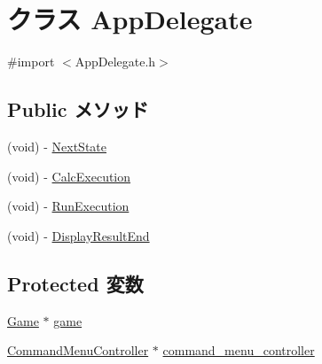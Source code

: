 \hypertarget{interface_app_delegate}{\section{クラス App\-Delegate}
\label{interface_app_delegate}
}


{\ttfamily \#import $<$App\-Delegate.\-h$>$}

\subsection*{Public メソッド}
\begin{DoxyCompactItemize}
\item 
(void) -\/ \hyperlink{interface_app_delegate_ac84379e54561a1bc2cf421eb4e9c49f4}{Next\-State}
\item 
(void) -\/ \hyperlink{interface_app_delegate_ade1d7fc268b1a5e2ba648c6cf160caf9}{Calc\-Execution}
\item 
(void) -\/ \hyperlink{interface_app_delegate_a1a8f91441d9c9bdfbf56a2ab02e7cb70}{Run\-Execution}
\item 
(void) -\/ \hyperlink{interface_app_delegate_a6d6ef9981f422be305b9d0b2217b89ff}{Display\-Result\-End}
\end{DoxyCompactItemize}
\subsection*{Protected 変数}
\begin{DoxyCompactItemize}
\item 
\hyperlink{class_game}{Game} $\ast$ \hyperlink{interface_app_delegate_a4f90e50bfc6e8e02332eb2734de1e93f}{game}
\item 
\hyperlink{interface_command_menu_controller}{Command\-Menu\-Controller} $\ast$ \hyperlink{interface_app_delegate_a63ca0325e79450fd36de6381349d6a7f}{command\-\_\-menu\-\_\-controller}
\end{DoxyCompactItemize}


